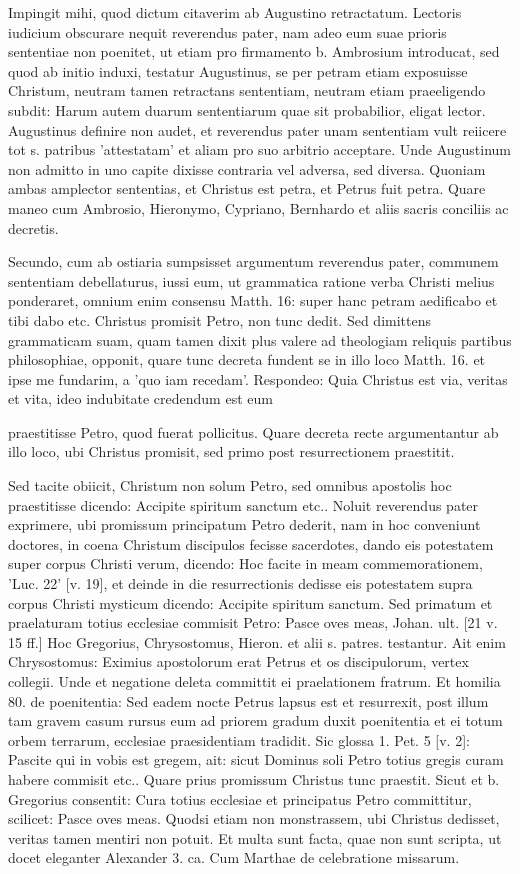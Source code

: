 Impingit mihi, quod dictum citaverim ab Augustino retractatum. Lectoris iudicium obscurare nequit reverendus pater, nam adeo eum suae prioris sententiae non poenitet, ut etiam pro firmamento b. Ambrosium introducat, sed quod ab initio induxi, testatur Augustinus, se per petram etiam exposuisse Christum, neutram tamen retractans sententiam, neutram etiam praeeligendo subdit: Harum autem duarum sententiarum quae sit probabilior, eligat lector. Augustinus definire non audet, et reverendus pater unam sententiam vult reiicere tot s. patribus 'attestatam' et aliam pro suo arbitrio acceptare. Unde Augustinum non admitto in uno capite dixisse contraria vel adversa, sed diversa. Quoniam ambas amplector sententias, et Christus est petra, et \marginpar{\small[293]} Petrus fuit petra. Quare maneo cum Ambrosio, Hieronymo, Cypriano, Bernhardo et aliis sacris conciliis ac decretis.

Secundo, cum ab ostiaria sumpsisset argumentum reverendus pater, communem sententiam debellaturus, iussi eum, ut grammatica ratione verba Christi melius ponderaret, omnium enim consensu Matth. 16: super hanc petram aedificabo et tibi dabo etc. Christus promisit Petro, non tunc dedit. Sed dimittens grammaticam suam, quam tamen dixit plus valere ad theologiam reliquis partibus philosophiae, opponit, quare tunc decreta fundent se in illo loco Matth. 16. et ipse me fundarim, a 'quo iam recedam'. Respondeo: Quia Christus est via, veritas et vita, ideo indubitate credendum est eum

praestitisse Petro, quod fuerat pollicitus. Quare decreta recte argumentantur ab illo loco, ubi Christus promisit, sed primo post resurrectionem praestitit.

Sed tacite obiicit, Christum non solum Petro, sed omnibus apostolis hoc praestitisse dicendo: Accipite spiritum sanctum etc.. Noluit reverendus pater exprimere, ubi promissum principatum Petro dederit, nam in hoc conveniunt doctores, in coena Christum discipulos fecisse sacerdotes, dando eis potestatem super corpus Christi verum, dicendo: Hoc facite in meam commemorationem, 'Luc. 22' [v. 19], et deinde in die resurrectionis dedisse eis potestatem supra corpus Christi mysticum dicendo: Accipite spiritum sanctum. Sed primatum et praelaturam totius ecclesiae commisit Petro: Pasce oves meas, Johan. ult. [21 v. 15 ff.] Hoc Gregorius, Chrysostomus, Hieron. et alii s. patres. testantur. Ait enim Chrysostomus: Eximius apostolorum erat Petrus et os discipulorum, vertex collegii. Unde et negatione deleta committit ei praelationem fratrum. Et homilia 80. de poenitentia: Sed eadem nocte Petrus lapsus est et resurrexit, post illum tam gravem casum rursus eum ad priorem gradum duxit poenitentia et ei totum orbem terrarum, ecclesiae praesidentiam tradidit. Sic glossa 1. Pet. 5 [v. 2]: Pascite qui in vobis est gregem, ait: sicut Dominus soli Petro totius gregis curam habere commisit etc.. Quare prius promissum Christus tunc praestit. Sicut et b. Gregorius consentit: Cura totius ecclesiae et principatus Petro committitur, scilicet: Pasce oves meas. Quodsi etiam non monstrassem, ubi Christus dedisset, veritas tamen mentiri non potuit. Et multa sunt facta, quae non sunt scripta, ut docet eleganter Alexander 3. ca. Cum Marthae de celebratione missarum.


